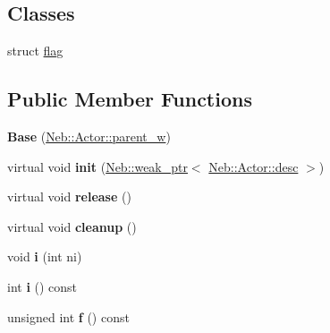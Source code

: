 \subsection*{\-Classes}
\begin{DoxyCompactItemize}
\item 
struct \hyperlink{structNeb_1_1Actor_1_1Base_1_1flag}{flag}
\end{DoxyCompactItemize}
\subsection*{\-Public \-Member \-Functions}
\begin{DoxyCompactItemize}
\item 
\hypertarget{classNeb_1_1Actor_1_1Base_ac45498cb0a5b4cfa704c7780a866cf0b}{{\bfseries \-Base} (\hyperlink{classNeb_1_1weak__ptr}{\-Neb\-::\-Actor\-::parent\-\_\-w})}\label{classNeb_1_1Actor_1_1Base_ac45498cb0a5b4cfa704c7780a866cf0b}

\item 
\hypertarget{classNeb_1_1Actor_1_1Base_ad828b2ea79bfe137650a683a5ff253b9}{virtual void {\bfseries init} (\hyperlink{classNeb_1_1weak__ptr}{\-Neb\-::weak\-\_\-ptr}$<$ \hyperlink{classNeb_1_1Actor_1_1desc}{\-Neb\-::\-Actor\-::desc} $>$)}\label{classNeb_1_1Actor_1_1Base_ad828b2ea79bfe137650a683a5ff253b9}

\item 
\hypertarget{classNeb_1_1Actor_1_1Base_a19d7b3eeac560db781b8dd9d7a044bef}{virtual void {\bfseries release} ()}\label{classNeb_1_1Actor_1_1Base_a19d7b3eeac560db781b8dd9d7a044bef}

\item 
\hypertarget{classNeb_1_1Actor_1_1Base_a4db2db31645b73484865f665e7b181e5}{virtual void {\bfseries cleanup} ()}\label{classNeb_1_1Actor_1_1Base_a4db2db31645b73484865f665e7b181e5}

\item 
\hypertarget{classNeb_1_1Actor_1_1Base_a732e42c211856137d5fa55d041606805}{void {\bfseries i} (int ni)}\label{classNeb_1_1Actor_1_1Base_a732e42c211856137d5fa55d041606805}

\item 
\hypertarget{classNeb_1_1Actor_1_1Base_a8b8facad0502a876dec354116069fc00}{int {\bfseries i} () const }\label{classNeb_1_1Actor_1_1Base_a8b8facad0502a876dec354116069fc00}

\item 
\hypertarget{classNeb_1_1Actor_1_1Base_ab093290863fcedd9ef36828de4438401}{unsigned int {\bfseries f} () const }\label{classNeb_1_1Actor_1_1Base_ab093290863fcedd9ef36828de4438401}


\end{DoxyCompactItemize}
